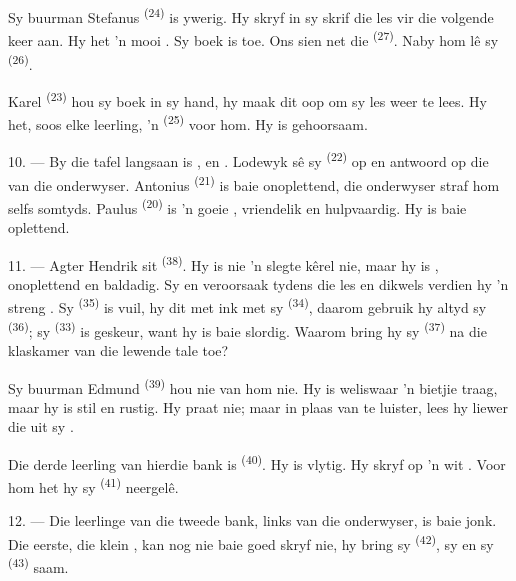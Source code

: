 Sy buurman Stefanus \textsuperscript{(24)} is ywerig. Hy skryf in sy skrif die les vir
die volgende keer aan. Hy het 'n mooi . Sy boek is toe. Ons sien net
die  \textsuperscript{(27)}. Naby hom lê sy 
\textsuperscript{(26)}.

Karel \textsuperscript{(23)} hou sy boek in sy hand, hy maak dit oop om sy les weer te
lees. Hy het, soos elke leerling, 'n  \textsuperscript{(25)} voor hom. Hy
is gehoorsaam.

10. --- By die tafel langsaan is ,  en .
Lodewyk sê sy  \textsuperscript{(22)} op en antwoord op die 
van die onderwyser. Antonius \textsuperscript{(21)} is baie onoplettend, die onderwyser
straf hom selfs somtyds. Paulus \textsuperscript{(20)} is 'n goeie ,
vriendelik en hulpvaardig. Hy is baie oplettend.

\VUsaut{4.2mm}
\VUsaut{3.2mm}

11. --- Agter Hendrik sit  \textsuperscript{(38)}. Hy is nie 'n slegte
kêrel nie, maar hy is , onoplettend en baldadig. Sy
 en  veroorsaak  tydens
die les en dikwels verdien hy 'n streng . Sy 
\textsuperscript{(35)} is vuil, hy  dit met ink met sy 
\textsuperscript{(34)}, daarom gebruik hy altyd sy 
\textsuperscript{(36)}; sy  \textsuperscript{(33)} is geskeur, want hy is
baie slordig. Waarom bring hy sy  \textsuperscript{(37)} na die
klaskamer van die lewende tale toe?

Sy buurman Edmund \textsuperscript{(39)} hou nie van hom nie. Hy is weliswaar 'n bietjie
traag, maar hy is stil en rustig. Hy praat nie; maar in plaas van te luister, lees hy
liewer die  uit sy .

Die derde leerling van hierdie bank is  \textsuperscript{(40)}. Hy is
vlytig. Hy skryf op 'n wit . Voor hom het hy sy 
\textsuperscript{(41)} neergelê.

12. --- Die leerlinge van die tweede bank, links van die onderwyser, is baie jonk. Die
eerste, die klein , kan nog nie baie goed skryf nie, hy bring sy
 \textsuperscript{(42)}, sy  en sy 
\textsuperscript{(43)} saam.

